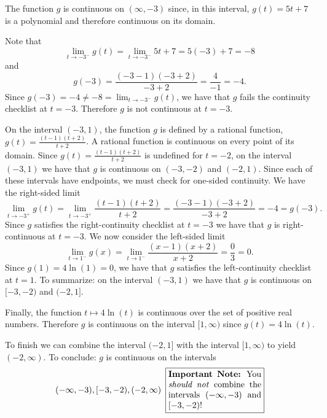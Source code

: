 \documentclass{article}
\theoremstyle{definition}
\begin{document}
\begin{Solution}
  The function $g$ is continuous on $(\infty, -3)$ since, in this interval, $g(t)=5t+7$ is a polynomial and therefore continuous on its domain.
  
  Note that
  \[
    \lim_{t \to -3^-} g(t) = \lim_{t \to -3^-} 5t+7 = 5(-3) + 7 = -8
  \]
  and
  \[
    g(-3) = \frac{(-3-1)(-3+2)}{-3+2} = \frac{4}{-1} = -4.
  \]
  Since $g(-3) = -4 \ne -8 = \lim_{t \to -3^-} g(t)$, we have that $g$ fails the continuity checklist at $t = -3$.
  Therefore $g$ is not continuous at $t = -3$.

  On the interval $(-3, 1)$, the function $g$ is defined by a rational function, $g(t) = \frac{(t-1)(t+2)}{t+2}$.
  A rational function is continuous on every point of its domain.
  Since $g(t) = \frac{(t-1)(t+2)}{t+2}$ is undefined for $t = -2$, on the interval $(-3, 1)$ we have that $g$ is continuous on $(-3, -2)$ and $(-2, 1)$.
  Since each of these intervals have endpoints, we must check for one-sided continuity.
  We have the right-sided limit
  \[
    \lim_{t \to -3^+} g(t) = \lim_{t \to -3^+} \frac{(t-1)(t+2)}{t+2} = \frac{(-3-1)(-3+2)}{-3+2} = -4 = g(-3).
  \]
  Since $g$ satisfies the right-continuity checklist at $t = -3$ we have that $g$ is right-continuous at $t = -3$.
  We now consider the left-sided limit
  \[
    \lim_{t \to 1^-} g(x) = \lim_{t \to 1^-} \frac{(x-1)(x+2)}{x+2} = \frac{0}{3} = 0.
  \]
  Since $g(1) = 4 \ln(1) = 0$, we have that $g$ satisfies the left-continuity checklist at $t = 1$.
  To summarize: on the interval $(-3, 1)$ we have that $g$ is continuous on $[-3, -2)$ and $(-2, 1]$.

  Finally, the function $t \mapsto 4 \ln(t)$ is continuous over the set of positive real numbers.
  Therefore $g$ is continuous on the interval $[1, \infty)$ since $g(t) = 4 \ln(t)$.

  To finish we can combine the interval $(-2, 1]$ with the interval $[1, \infty)$ to yield $(-2, \infty)$.
  To conclude: $g$ is continuous on the intervals \[(-\infty, -3), [-3, -2), (-2, \infty)\hspace{0.5em}\fbox{\parbox[c][]{1.5in}{\textbf{Important Note:} You \emph{should not} combine the intervals $(-\infty, -3)$ and $[-3, -2)$!}}\]
\end{Solution}
\end{document}
